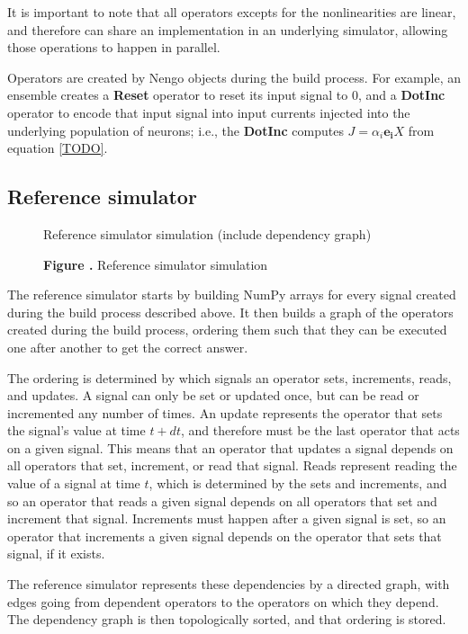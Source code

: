 \documentclass{frontiersSCNS}
\begin{document}
It is important to note that all operators
excepts for the nonlinearities are linear,
and therefore can share an implementation
in an underlying simulator,
allowing those operations to happen in parallel.

Operators are created
by Nengo objects during the build process.
For example, an ensemble creates
a \textbf{Reset} operator to reset
its input signal to 0,
and a \textbf{DotInc} operator
to encode that input signal into
input currents injected into
the underlying population of neurons;
i.e., the \textbf{DotInc} computes
$J = \alpha_i \mathbf{e_i} X$ from equation \eqref{TODO}.

\subsection{Reference simulator}

\begin{figure}
\begin{center}
  Reference simulator simulation (include dependency graph)
\end{center}
 \textbf{\label{fig:01} Figure .}{
   Reference simulator simulation}
\end{figure}

The reference simulator starts by
building NumPy arrays
for every signal created during the build process
described above.
It then builds a graph of the
operators created during the build process,
ordering them such that they can be
executed one after another to get the correct answer.

The ordering is determined
by which signals an operator
sets, increments, reads, and updates.
A signal can only be set or updated once,
but can be read or incremented any number of times.
An update represents the operator that sets
the signal's value at time $t+dt$,
and therefore must be the last operator
that acts on a given signal.
This means that an operator
that updates a signal depends on
all operators that set, increment,
or read that signal.
Reads represent reading the value
of a signal at time $t$,
which is determined by the sets
and increments, and so
an operator that reads a given signal
depends on all operators that
set and increment that signal.
Increments must happen
after a given signal is set,
so an operator that increments a given
signal depends on the operator
that sets that signal, if it exists.

The reference simulator represents
these dependencies by a directed graph,
with edges going from
dependent operators to
the operators on which they depend.
The dependency graph is then topologically sorted,
and that ordering is stored.
\end{document}
